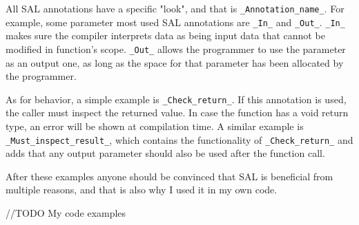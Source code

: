 		All SAL annotations have a specific "look", and that is \texttt{\_Annotation\_name\_}. For example, some parameter most used SAL annotations are \texttt{\_In\_} and \texttt{\_Out\_}. \texttt{\_In\_} makes sure the compiler interprets data as being input data that cannot be modified in function's scope. \texttt{\_Out\_} allows the programmer to use the parameter as an output one, as long as the space for that parameter has been allocated by the programmer.
		
		As for behavior, a simple example is \texttt{\_Check\_return\_}. If this annotation is used, the caller must inspect the returned value. In case the function has a void return type, an error will be shown at compilation time. A similar example is \texttt{\_Must\_inspect\_result\_}, which contains the functionality of \texttt{\_Check\_return\_} and adds that any output parameter should also be used after the function call.
		
		After these examples anyone should be convinced that SAL is beneficial from multiple reasons, and that is also why I used it in my own code.
		
		//TODO
		My code examples
		